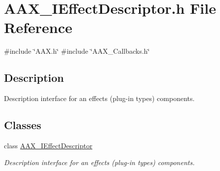 \hypertarget{a00590}{}\section{A\+A\+X\+\_\+\+I\+Effect\+Descriptor.\+h File Reference}
\label{a00590}
{\ttfamily \#include \char`\"{}A\+A\+X.\+h\char`\"{}}\newline
{\ttfamily \#include \char`\"{}A\+A\+X\+\_\+\+Callbacks.\+h\char`\"{}}\newline


\subsection{Description}
Description interface for an effect\textquotesingle{}s (plug-\/in type\textquotesingle{}s) components. 

\subsection*{Classes}
\begin{DoxyCompactItemize}
\item 
class \mbox{\hyperlink{a01813}{A\+A\+X\+\_\+\+I\+Effect\+Descriptor}}
\begin{DoxyCompactList}\small\item\em Description interface for an effect\textquotesingle{}s (plug-\/in type\textquotesingle{}s) components. \end{DoxyCompactList}\end{DoxyCompactItemize}
